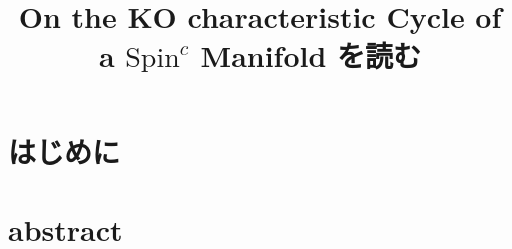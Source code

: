 \documentclass[dvipdfmx]{jsarticle}
\title{On the KO characteristic Cycle of a \(\text{Spin}^c\) Manifold を読む}
\date{}
\begin{document}
\section*{はじめに}


\section*{abstract}

\end{document}
